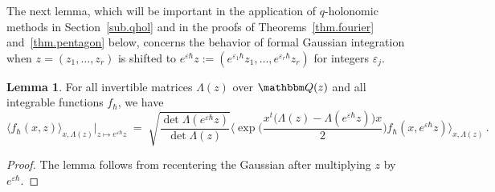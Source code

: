 \documentclass[12pt,reqno]{amsart}
\theoremstyle{definition}
\newtheorem{lemma}[theorem]{Lemma}
\def\BQ{\mathbbm Q}
\def\ve{\varepsilon}
\def\be{\begin{equation}}
\def\ee{\end{equation}}
\renewcommand{\=}{\;=\;}
\begin{document}
The next lemma, which will be important in the application of $q$-holonomic
methods in Section~\ref{sub.qhol} and in the proofs of Theorems~\ref{thm.fourier}
and~\ref{thm.pentagon} below, concerns the behavior of formal Gaussian
integration when $z=(z_1,\dots,z_r)$ is shifted to
$e^{\ve \hbar}z:=(e^{\ve_1 \hbar}z_1,\dots,e^{\ve_r \hbar}z_r)$ for integers $\ve_j$.

\begin{lemma}
\label{lem.ff2}
For all invertible matrices $\Lambda(z)$ over $\BQ(z)$ and all integrable functions
$f_\hbar$, we have
\be
\label{eq.ff2}
\langle f_{\hbar}(x,z)\rangle_{x,\Lambda(z)} |_{z \mapsto e^{\ve \hbar}z}
\= \sqrt{\frac{\det\Lambda(e^{\ve\hbar}z)}{\det\Lambda(z)}} 
\Big\langle \exp\bigg(
\frac{x^{t}\big(\Lambda(z)-\Lambda(e^{\ve\hbar}z)\big)x}{2}\bigg)
f_{\hbar}(x,e^{\ve\hbar}z) \Big\rangle_{x,\Lambda(z)} \,.
\ee
\end{lemma}

\begin{proof}
The lemma follows from recentering the Gaussian after multiplying
$z$ by $e^{\ve\hbar}$.
\end{proof}
\end{document}
